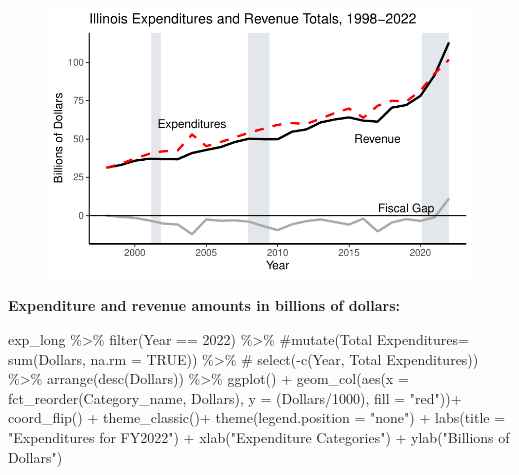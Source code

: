 \documentclass[
  letterpaper,
  DIV=11,
  numbers=noendperiod]{scrreport}
\newenvironment{Shaded}{\begin{snugshade}}{\end{snugshade}}
\newcommand{\AttributeTok}[1]{\textcolor[rgb]{0.40,0.45,0.13}{#1}}
\newcommand{\CommentTok}[1]{\textcolor[rgb]{0.37,0.37,0.37}{#1}}
\newcommand{\DecValTok}[1]{\textcolor[rgb]{0.68,0.00,0.00}{#1}}
\newcommand{\FunctionTok}[1]{\textcolor[rgb]{0.28,0.35,0.67}{#1}}
\newcommand{\NormalTok}[1]{\textcolor[rgb]{0.00,0.23,0.31}{#1}}
\newcommand{\SpecialCharTok}[1]{\textcolor[rgb]{0.37,0.37,0.37}{#1}}
\newcommand{\StringTok}[1]{\textcolor[rgb]{0.13,0.47,0.30}{#1}}
\begin{document}
\begin{figure}[H]

{\centering \includegraphics{./Everything_files/figure-pdf/fiscal-gap-2.pdf}

}

\end{figure}

\textbf{Expenditure and revenue amounts in billions of dollars:}

\begin{Shaded}
\begin{Highlighting}[]
\NormalTok{exp\_long }\SpecialCharTok{\%\textgreater{}\%}
  \FunctionTok{filter}\NormalTok{(Year }\SpecialCharTok{==} \DecValTok{2022}\NormalTok{) }\SpecialCharTok{\%\textgreater{}\%}
  \CommentTok{\#mutate(\textasciigrave{}Total Expenditures\textasciigrave{}= sum(Dollars, na.rm = TRUE)) \%\textgreater{}\%}
 \CommentTok{\# select({-}c(Year, \textasciigrave{}Total Expenditures\textasciigrave{})) \%\textgreater{}\%}
  \FunctionTok{arrange}\NormalTok{(}\FunctionTok{desc}\NormalTok{(}\StringTok{\textasciigrave{}}\AttributeTok{Dollars}\StringTok{\textasciigrave{}}\NormalTok{)) }\SpecialCharTok{\%\textgreater{}\%}
  \FunctionTok{ggplot}\NormalTok{() }\SpecialCharTok{+} 
  \FunctionTok{geom\_col}\NormalTok{(}\FunctionTok{aes}\NormalTok{(}\AttributeTok{x =} \FunctionTok{fct\_reorder}\NormalTok{(Category\_name, }\StringTok{\textasciigrave{}}\AttributeTok{Dollars}\StringTok{\textasciigrave{}}\NormalTok{), }\AttributeTok{y =}\NormalTok{ (}\StringTok{\textasciigrave{}}\AttributeTok{Dollars}\StringTok{\textasciigrave{}}\SpecialCharTok{/}\DecValTok{1000}\NormalTok{), }\AttributeTok{fill =} \StringTok{"red"}\NormalTok{))}\SpecialCharTok{+} 
  \FunctionTok{coord\_flip}\NormalTok{() }\SpecialCharTok{+}
      \FunctionTok{theme\_classic}\NormalTok{()}\SpecialCharTok{+}
  \FunctionTok{theme}\NormalTok{(}\AttributeTok{legend.position =} \StringTok{"none"}\NormalTok{) }\SpecialCharTok{+}
  \FunctionTok{labs}\NormalTok{(}\AttributeTok{title =} \StringTok{"Expenditures for FY2022"}\NormalTok{) }\SpecialCharTok{+}
    \FunctionTok{xlab}\NormalTok{(}\StringTok{"Expenditure Categories"}\NormalTok{) }\SpecialCharTok{+}
  \FunctionTok{ylab}\NormalTok{(}\StringTok{"Billions of Dollars"}\NormalTok{) }
\end{Highlighting}
\end{Shaded}
\end{document}

